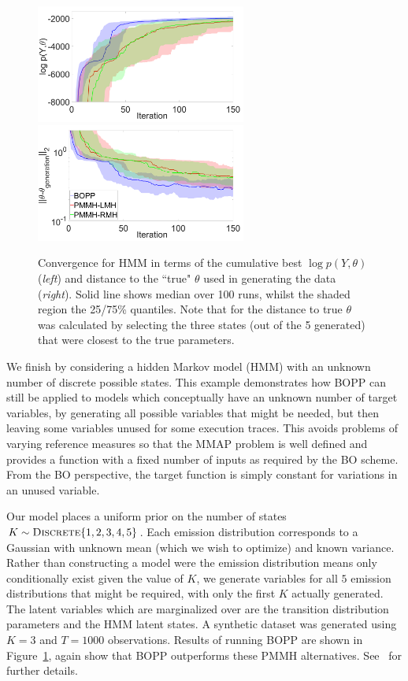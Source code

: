 
\begin{figure}[t]
	\centering
	\includegraphics[width=2.72in]{hmm/hmm_ML}
	\includegraphics[width=2.72in]{hmm/hmm_distance}
	\caption{Convergence for HMM in terms of the cumulative best $\log p\left(Y,\theta\right)$ (\emph{left}) and distance to the ``true" $\theta$ used in generating the data (\emph{right}). Solid line shows median over 100 runs, whilst the shaded region the 25/75\% quantiles.  Note that for the distance to true $\theta$ was calculated by selecting the three states (out of the 5 generated) that were closest to the true parameters.  \label{fig:hmm}}
\end{figure}

We finish by considering a hidden Markov model (HMM) with an unknown number of discrete possible states.  
This example demonstrates how BOPP can still be applied to models which conceptually have an 
unknown number of target variables, by generating all possible variables that might be needed, 
but then leaving some variables unused for some execution traces.  This avoids problems 
of varying reference measures so that the MMAP problem is well defined  and provides a 
function with a fixed number of inputs as required by the BO scheme.  From the BO 
perspective, the target function is simply constant for variations in an unused variable.

Our model places a uniform prior on the number of states $K \sim \textsc{Discrete}\{1,2,3,4,5\}$.
Each emission distribution corresponds to a Gaussian with unknown mean (which we wish to
optimize) and known variance.  Rather than constructing a model were the emission distribution
means only conditionally exist given the value of $K$, we generate variables for all $5$ emission
distributions that might be required, with only the first $K$ actually generated.  The latent
variables which are marginalized over are the transition distribution parameters and the HMM latent
states.  A synthetic dataset was generated using $K=3$ and $T=1000$ observations.  Results of running BOPP are shown
in Figure~\ref{fig:hmm}, again show that BOPP outperforms these PMMH alternatives.  See~\cite{rainforth2017boppArxiv}
for further details.